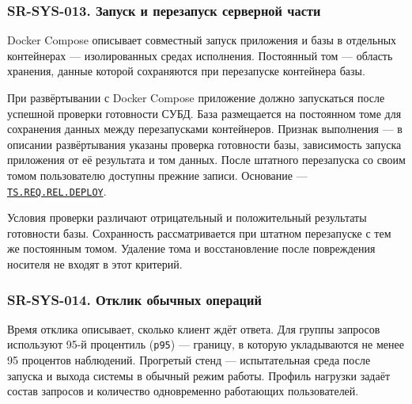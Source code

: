 \documentclass[12pt,a4paper]{article}
\begin{document}
\subsubsection{SR-SYS-013. Запуск и перезапуск серверной части}\label{sr-sys-013-ux437ux430ux43fux443ux441ux43a-ux438-ux43fux435ux440ux435ux437ux430ux43fux443ux441ux43a-ux441ux435ux440ux432ux435ux440ux43dux43eux439-ux447ux430ux441ux442ux438}

\hypertarget{sr-sys-013-запуск-и-перезапуск-серверной-части}{}

\hypertarget{sr-sys-013}{}

Docker Compose описывает совместный запуск приложения и базы в отдельных контейнерах --- изолированных средах исполнения. Постоянный том --- область хранения, данные которой сохраняются при перезапуске контейнера базы.

При развёртывании с Docker Compose приложение должно запускаться после успешной проверки готовности СУБД. База размещается на постоянном томе для сохранения данных между перезапусками контейнеров. Признак выполнения --- в описании развёртывания указаны проверка готовности базы, зависимость запуска приложения от её результата и том данных. После штатного перезапуска со своим томом пользователю доступны прежние записи. Основание --- {\href{../02\_Техническое\_задание/Техническое\_задание.pdf\#ts-req-rel-deploy}{\texttt{TS.\allowbreak{}REQ.\allowbreak{}REL.\allowbreak{}DEPLOY}}}.

Условия проверки различают отрицательный и положительный результаты готовности базы. Сохранность рассматривается при штатном перезапуске с тем же постоянным томом. Удаление тома и восстановление после повреждения носителя не входят в этот критерий.

\subsubsection{SR-SYS-014. Отклик обычных операций}\label{sr-sys-014-ux43eux442ux43aux43bux438ux43a-ux43eux431ux44bux447ux43dux44bux445-ux43eux43fux435ux440ux430ux446ux438ux439}

\hypertarget{sr-sys-014-отклик-обычных-операций}{}

\hypertarget{sr-sys-014}{}

Время отклика описывает, сколько клиент ждёт ответа. Для группы запросов используют 95-й процентиль (\texttt{p95}) --- границу, в которую укладываются не менее 95 процентов наблюдений. Прогретый стенд --- испытательная среда после запуска и выхода системы в обычный режим работы. Профиль нагрузки задаёт состав запросов и количество одновременно работающих пользователей.
\end{document}

